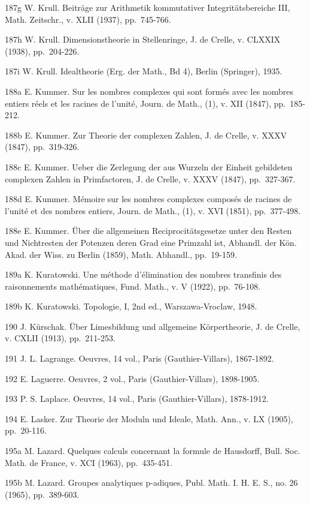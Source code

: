 187g W. Krull. Beiträge zur Arithmetik kommutativer Integritätsbereiche III, Math. Zeitschr., v. XLII (1937), pp.~745-766.

187h W. Krull. Dimensionstheorie in Stellenringe, J. de Crelle, v. CLXXIX (1938), pp.~204-226.

187i W. Krull. Idealtheorie (Erg. der Math., Bd 4), Berlin (Springer), 1935.

188a E. Kummer. Sur les nombres complexes qui sont formés avec les nombres entiers réels et les racines de l'unité, Journ. de Math., (1), v. XII (1847), pp.~185-212.

188b E. Kummer. Zur Theorie der complexen Zahlen, J. de Crelle, v. XXXV (1847), pp.~319-326.

188c E. Kummer. Ueber die Zerlegung der aus Wurzeln der Einheit gebildeten complexen Zahlen in Primfactoren, J. de Crelle, v. XXXV (1847), pp.~327-367.

188d E. Kummer. Mémoire sur les nombres complexes composés de racines de l'unité et des nombres entiers, Journ. de Math., (1), v. XVI (1851), pp.~377-498.

188e E. Kummer. Über die allgemeinen Reciprocitätsgesetze unter den Resten und Nichtresten der Potenzen deren Grad eine Primzahl ist, Abhandl. der Kön. Akad. der Wiss. zu Berlin (1859), Math. Abhandl., pp.~19-159.

189a K. Kuratowski. Une méthode d'élimination des nombres transfinis des raisonnements mathématiques, Fund. Math., v. V (1922), pp.~76-108.

189b K. Kuratowski. Topologie, I, 2nd ed., Warszawa-Vroclaw, 1948.

190 J. Kürschak. Über Limesbildung und allgemeine Körpertheorie, J. de Crelle, v. CXLII (1913), pp.~211-253.

191 J. L. Lagrange. Oeuvres, 14 vol., Paris (Gauthier-Villars), 1867-1892.

192 E. Laguerre. Oeuvres, 2 vol., Paris (Gauthier-Villars), 1898-1905.

193 P. S. Laplace. Oeuvres, 14 vol., Paris (Gauthier-Villars), 1878-1912.

194 E. Lasker. Zur Theorie der Moduln und Ideale, Math. Ann., v. LX (1905), pp.~20-116.

195a M. Lazard. Quelques calculs concernant la formule de Hausdorff, Bull. Soc. Math. de France, v. XCI (1963), pp.~435-451.

195b M. Lazard. Groupes analytiques p-adiques, Publ. Math. I. H. E. S., no. 26 (1965), pp.~389-603.

